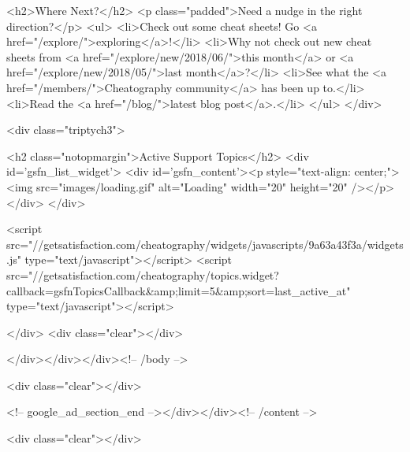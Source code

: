        <h2>Where Next?</h2>
        <p class="padded">Need a nudge in the right direction?</p>
        <ul>
            <li>Check out some cheat sheets! Go <a href="/explore/">exploring</a>!</li>
            <li>Why not check out new cheat sheets from <a href="/explore/new/2018/06/">this month</a> or <a href="/explore/new/2018/05/">last  month</a>?</li>
            <li>See what the <a href="/members/">Cheatography community</a> has been up to.</li>
            <li>Read the <a href="/blog/">latest blog post</a>.</li>
        </ul>
    </div>

    <div class="triptych3">

        <h2 class="notopmargin">Active Support Topics</h2>
        <div id='gsfn_list_widget'>
            <div id='gsfn_content'><p style="text-align: center;"><img src="images/loading.gif" alt="Loading" width="20" height="20" /></p></div>
        </div>

        <script src="//getsatisfaction.com/cheatography/widgets/javascripts/9a63a43f3a/widgets.js" type="text/javascript"></script>
        <script src="//getsatisfaction.com/cheatography/topics.widget?callback=gsfnTopicsCallback&amp;limit=5&amp;sort=last_active_at" type="text/javascript"></script>

    </div>
        <div class="clear"></div>

        </div></div></div><!-- /body -->

        <div class="clear"></div>

        <!-- google_ad_section_end --></div></div><!-- /content -->

        <div class="clear"></div>


